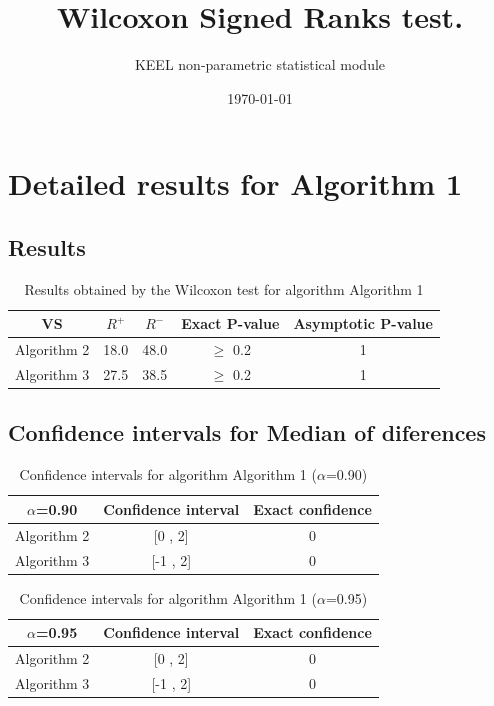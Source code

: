 \documentclass[a4paper,10pt]{article}
\title{Wilcoxon Signed Ranks test.}
\date{\today}
\author{KEEL non-parametric statistical module}
\begin{document}
\pagestyle{empty}
\maketitle
\thispagestyle{empty}



\section{Detailed results for Algorithm 1}


\subsection{Results}

\begin{table}[!htp]
\centering\small
\begin{tabular}{
|c|c|c|c|c|}
\hline
 VS & $R^{+}$ & $R^{-}$ & Exact P-value & Asymptotic P-value \\ \hline 
Algorithm 2 & 18.0 & 48.0 & $\geq$ 0.2 & 1\\ \hline 
Algorithm 3 & 27.5 & 38.5 & $\geq$ 0.2 & 1\\ \hline 

\end{tabular}
\caption{Results obtained by the Wilcoxon test for algorithm Algorithm 1}
\end{table}

\subsection{Confidence intervals for Median of diferences}

\begin{table}[!htp]
\centering\small
\begin{tabular}{
|c|c|c|}
\hline
 $\alpha$=0.90 & Confidence interval & Exact confidence \\ \hline 
Algorithm 2 & [0 , 2] & 0\\ \hline 
Algorithm 3 & [-1 , 2] & 0\\ \hline 

\end{tabular}
\caption{Confidence intervals for algorithm Algorithm 1 ($\alpha$=0.90)}
\end{table}
\begin{table}[!htp]
\centering\small
\begin{tabular}{
|c|c|c|}
\hline
 $\alpha$=0.95 & Confidence interval & Exact confidence \\ \hline 
Algorithm 2 & [0 , 2] & 0\\ \hline 
Algorithm 3 & [-1 , 2] & 0\\ \hline 

\end{tabular}
\caption{Confidence intervals for algorithm Algorithm 1 ($\alpha$=0.95)}
\end{table}
\end{document}
